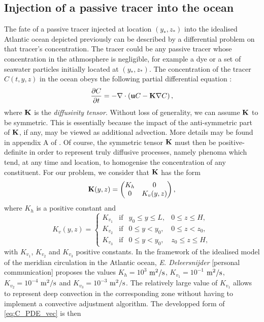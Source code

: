 \subsection{Injection of a passive tracer into the ocean} \label{sec:transport_overturner}
The fate of a passive tracer injected at location $(y_*,z_*)$ into the idealised Atlantic ocean depicted previously can be described by a differential problem on that tracer's concentration. The tracer could be any passive tracer whose concentration in the athmosphere is negligible, for example a dye or a set of seawater particles initially located at $(y_*,z_*)$. The concentration of the tracer $C(t,y,z)$ in the ocean obeys the following partial differential equation :
\begin{equation}\label{eq:C_PDE_vec}
	\frac{\partial C}{\partial t} = -\nabla \cdot \left(\b uC - \b K \nabla C\right),
\end{equation}
where $\b K$ is the \textit{diffusivity tensor}. Without loss of generality, we can assume $\b K$ to be symmetric. This is essentially because the impact of the anti-symmetric part of $\b K$, if any, may be viewed as additional advection. More details may be found in appendix A of \cite{deleersnijder2001concept}. Of course, the symmetric tensor $\b K$ must then be positive-definite in order to represent truly diffusive processes, namely phenoma which tend, at any time and location, to homogenise the concentration of any constituent. For our problem, we consider that $\b K$ has the form
\begin{equation} \label{eq:K}
	\b K(y,z) = \begin{pmatrix} K_h & 0 \\ 0 & K_v(y,z) \end{pmatrix},
\end{equation}
where $K_h$ is a positive constant and
\begin{equation} \label{eq:Kv}
	K_v(y,z) = \left\{ 
		\begin{array}{lrrr}
			K_{v_1} & \mbox{if} & y_0 \le y \le L, & 0 \le z \le H,\\
			K_{v_2} & \mbox{if} & 0 \le y < y_0, & 0 \le z < z_0,\\
			K_{v_3} & \mbox{if} & 0 \le y < y_0, & z_0 \le z \le H,
		\end{array}
	\right.
\end{equation}
with $K_{v_1}$, $K_{v_2}$ and $K_{v_3}$ positive constants. In the framework of the idealised model of the meridian circulation in the Atlantic ocean, \textit{E. Deleersnijder} [personal communication] proposes the values $K_h = 10^3$ $\rm{m^2/s}$, $K_{v_1} = 10^{-1}$ $\rm{m^2/s}$, $K_{v_2} = 10^{-4}$ $\rm{m^2/s}$ and $K_{v_3} = 10^{-3}$ $\rm{m^2/s}$. The relatively large value of $K_{v_1}$ allows to represent deep convection in the corresponding zone without having to implement a convective adjustment algorithm. The developped form of \eqref{eq:C_PDE_vec} is then
